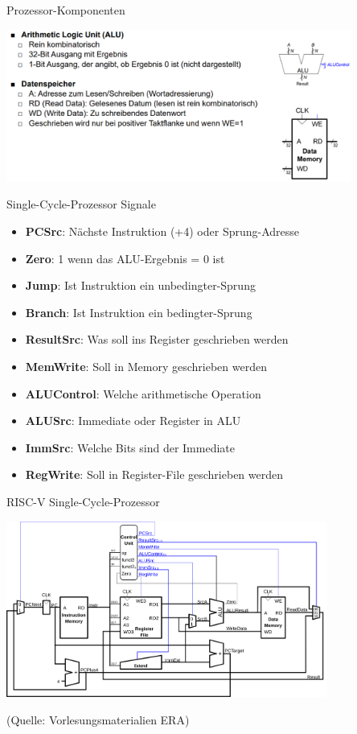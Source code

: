 \documentclass[
  german,            %
  aspectratio=169,    %
]{tumbeamer}
\begin{document}
\begin{frame}[c, fragile]{Prozessor-Komponenten}{}
	\begin{center}
		\includegraphics[width=0.85\textwidth]{w08_prozessorcomponents2.png}
	\end{center}
\end{frame}

\begin{frame}[c, fragile]{Single-Cycle-Prozessor Signale}{}
	\begin{itemize}
		\item \textbf{PCSrc}: Nächste Instruktion (+4) oder Sprung-Adresse
		\item \textbf{Zero}: 1 wenn das ALU-Ergebnis = 0 ist
		\item \textbf{Jump}: Ist Instruktion ein unbedingter-Sprung
		\item \textbf{Branch}: Ist Instruktion ein bedingter-Sprung
		\item \textbf{ResultSrc}: Was soll ins Register geschrieben werden
		\item \textbf{MemWrite}: Soll in Memory geschrieben werden
		\item \textbf{ALUControl}: Welche arithmetische Operation
		\item \textbf{ALUSrc}: Immediate oder Register in ALU
		\item \textbf{ImmSrc}: Welche Bits sind der Immediate
		\item \textbf{RegWrite}: Soll in Register-File geschrieben werden
	\end{itemize}
\end{frame}

\begin{frame}[c]{RISC-V Single-Cycle-Prozessor}{}
	\begin{center}
		\includegraphics[width=0.79\textwidth]{w08_single_cycle.png}
	\end{center}
	\centering
	\tiny (Quelle: Vorlesungsmaterialien ERA)
\end{frame}
\end{document}
